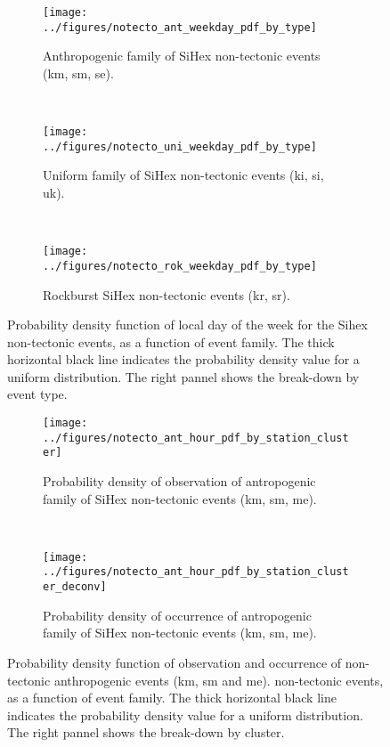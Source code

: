 \begin{figure}
\centering
\begin{subfigure}[t]{0.75\textwidth}
	\centering
	\texttt{[image: ../figures/notecto\_ant\_weekday\_pdf\_by\_type]}
	\caption{Anthropogenic family of SiHex non-tectonic events (km, sm, se).}
	\label{fg:notecto_day_ant}
\end{subfigure}
~
\begin{subfigure}[t]{0.75\textwidth}
	\centering
	\texttt{[image: ../figures/notecto\_uni\_weekday\_pdf\_by\_type]}
	\caption{Uniform family of SiHex non-tectonic events (ki, si, uk).}
	\label{fg:notecto_day_uni}
\end{subfigure}
~
\begin{subfigure}[t]{0.75\textwidth}
	\centering
	\texttt{[image: ../figures/notecto\_rok\_weekday\_pdf\_by\_type]}
	\caption{Rockburst SiHex non-tectonic events (kr, sr).}
	\label{fg:notecto_day_rok}
\end{subfigure}
\caption{Probability density function of local day of the week for the Sihex
non-tectonic events, as a function of event family.  The thick horizontal black
line indicates the probability density value for a uniform distribution.  The
right pannel shows the break-down by event type.}
\label{fg:notecto_day}
\end{figure}

\begin{figure}
\centering
\begin{subfigure}[t]{\textwidth}
	\centering
	\texttt{[image: ../figures/notecto\_ant\_hour\_pdf\_by\_station\_cluster]}
	\caption{Probability density of observation of antropogenic family of
	SiHex non-tectonic events (km, sm, me).}
	\label{fg:ant_obs_prob}
\end{subfigure}
~
\begin{subfigure}[t]{\textwidth}
	\centering
	\texttt{[image: ../figures/notecto\_ant\_hour\_pdf\_by\_station\_cluster\_deconv]}
	\caption{Probability density of occurrence of antropogenic family of
	SiHex non-tectonic events (km, sm, me).}
	\label{fg:ant_prob}
\end{subfigure}
\caption{Probability density function of observation and occurrence of non-tectonic anthropogenic events (km, sm and me).
non-tectonic events, as a function of event family.  The thick horizontal black
line indicates the probability density value for a uniform distribution.  The
right pannel shows the break-down by cluster.}
\label{fg:blast_prob}
\end{figure}

